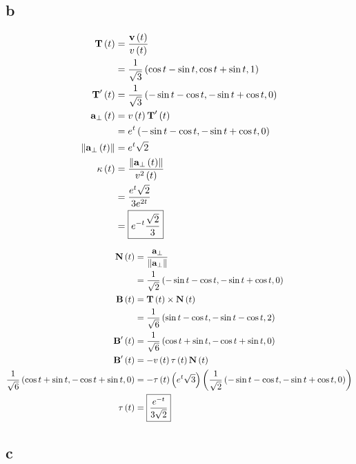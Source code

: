 \documentclass{article}
\begin{document}
\subsection*{b}
\begin{align*}
  \textbf{T} \left ( t \right) &= \frac{\textbf{v} \left ( t \right)}{v \left ( t \right)} \\
                  &= \frac{1}{\sqrt{3}} \left ( \cos t - \sin t, \cos t + \sin t, 1 \right) \\
  \textbf{T}' \left ( t \right) &= \frac{1}{\sqrt{3}} \left ( - \sin t - \cos t, - \sin t + \cos t, 0 \right) \\
  \textbf{a}_{\perp} \left ( t \right) &= v \left ( t \right) \textbf{T}' \left ( t \right) \\
                  &= e^t \left ( - \sin t - \cos t, - \sin t + \cos t, 0 \right) \\
  \left\lVert\textbf{a}_{\perp} \left ( t \right)\right\rVert &= e^t \sqrt{2} \\
  \kappa \left ( t \right) &= \frac{\left\lVert\textbf{a}_{\perp} \left ( t \right)\right\rVert}{v^2 \left ( t \right)} \\
                  &= \frac{e^t \sqrt{2}}{3 e^{2t}} \\
                  &= \boxed{e^{-t} \frac{\sqrt{2}}{3}} \\
\end{align*}

\begin{align*}
  \textbf{N} \left ( t \right) &= \frac{\textbf{a}_{\perp}}{\left\lVert\textbf{a}_{\perp}\right\rVert} \\
                  &= \frac{1}{\sqrt{2}} \left ( - \sin t - \cos t, - \sin t + \cos t, 0 \right) \\
  \textbf{B} \left ( t \right) &= \textbf{T} \left ( t \right) \times \textbf{N} \left ( t \right) \\
                  &= \frac{1}{\sqrt{6}} \left ( \sin t - \cos t, - \sin t - \cos t, 2 \right) \\
  \textbf{B}' \left ( t \right) &= \frac{1}{\sqrt{6}} \left ( \cos t + \sin t, - \cos t + \sin t, 0 \right) \\
  \textbf{B}' \left ( t \right) &= - v \left ( t \right) \tau \left ( t \right) \textbf{N} \left ( t \right) \\
  \frac{1}{\sqrt{6}} \left ( \cos t + \sin t, - \cos t + \sin t, 0 \right) &= - \tau \left ( t \right) \left ( e^t \sqrt{3} \right) \left ( \frac{1}{\sqrt{2}} \left ( - \sin t - \cos t, - \sin t + \cos t, 0 \right) \right) \\
  \tau \left ( t \right) &= \boxed{\frac{e^{-t}}{3 \sqrt{2}}} \\
\end{align*}

\subsection*{c}
\end{document}
